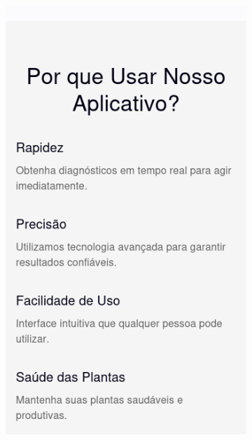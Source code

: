 \begin{figure}[p]
    \begin{subfigure}{0.45\textwidth}
        \centering
        \includegraphics[width=\linewidth, height=0.4\textheight, keepaspectratio]{images/homepage3.png}
    \end{subfigure}
    \begin{subfigure}{0.45\textwidth}
        \centering

\end{subfigure}
\end{figure}
